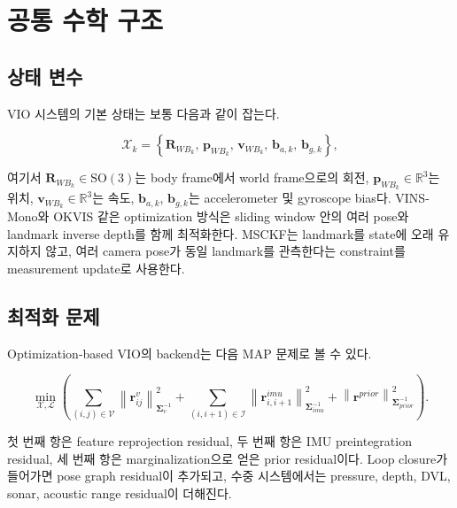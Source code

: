 \documentclass[11pt,a4paper]{article}
\newcommand{\R}{\mathbb{R}}
\newcommand{\SO}{\mathrm{SO}(3)}
\newcommand{\norm}[1]{\left\lVert #1 \right\rVert}
\begin{document}
\section{공통 수학 구조}

\subsection{상태 변수}

VIO 시스템의 기본 상태는 보통 다음과 같이 잡는다.

\begin{equation}
\mathcal{X}_k =
\left\{
\mathbf{R}_{WB_k},\,
\mathbf{p}_{WB_k},\,
\mathbf{v}_{WB_k},\,
\mathbf{b}_{a,k},\,
\mathbf{b}_{g,k}
\right\},
\end{equation}

여기서 \(\mathbf{R}_{WB_k}\in\SO\)는 body frame에서 world frame으로의 회전, \(\mathbf{p}_{WB_k}\in\R^3\)는 위치, \(\mathbf{v}_{WB_k}\in\R^3\)는 속도, \(\mathbf{b}_{a,k}\), \(\mathbf{b}_{g,k}\)는 accelerometer 및 gyroscope bias다.
VINS-Mono와 OKVIS 같은 optimization 방식은 sliding window 안의 여러 pose와 landmark inverse depth를 함께 최적화한다.
MSCKF는 landmark를 state에 오래 유지하지 않고, 여러 camera pose가 동일 landmark를 관측한다는 constraint를 measurement update로 사용한다.

\subsection{최적화 문제}

Optimization-based VIO의 backend는 다음 MAP 문제로 볼 수 있다.

\begin{equation}
\min_{\mathcal{X},\mathcal{L}}
\left(
\sum_{(i,j)\in\mathcal{V}}
\norm{\mathbf{r}^{v}_{ij}}^2_{\mathbf{\Sigma}^{-1}_{v}}
+
\sum_{(i,i+1)\in\mathcal{I}}
\norm{\mathbf{r}^{imu}_{i,i+1}}^2_{\mathbf{\Sigma}^{-1}_{imu}}
+
\norm{\mathbf{r}^{prior}}^2_{\mathbf{\Sigma}^{-1}_{prior}}
\right).
\end{equation}

첫 번째 항은 feature reprojection residual, 두 번째 항은 IMU preintegration residual, 세 번째 항은 marginalization으로 얻은 prior residual이다.
Loop closure가 들어가면 pose graph residual이 추가되고, 수중 시스템에서는 pressure, depth, DVL, sonar, acoustic range residual이 더해진다.
\end{document}
